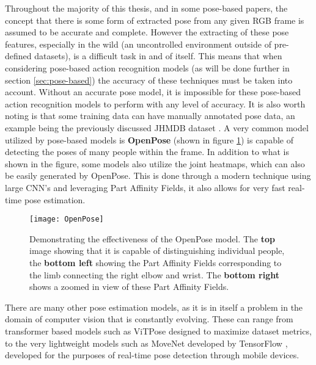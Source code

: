 Throughout the majority of this thesis, and in some pose-based papers, the concept that there is some form of extracted pose from any given RGB frame is assumed to be accurate and complete. However the extracting of these pose features, especially in the wild (an uncontrolled environment outside of pre-defined datasets), is a difficult task in and of itself. This means that when considering pose-based action recognition models (as will be done further in section \ref{sec:pose-based}) the accuracy of these techniques must be taken into account. Without an accurate pose model, it is impossible for these pose-based action recognition models to perform with any level of accuracy. It is also worth noting is that some training data can have manually annotated pose data, an example being the previously discussed JHMDB dataset \cite{JHMDB}. A very common model utilized by pose-based models is \textbf{OpenPose} \cite{openpose} (shown in figure \ref{fig:openpose}) is capable of detecting the poses of many people within the frame. In addition to what is shown in the figure, some models also utilize the joint heatmaps, which can also be easily generated by OpenPose. This is done through a modern technique using large CNN's and leveraging Part Affinity Fields, it also allows for very fast real-time pose estimation.

\begin{figure}[ht]
	\texttt{[image: OpenPose]}
	\centering
	\caption{Demonstrating the effectiveness of the OpenPose \cite{openpose} model. The \textbf{top} image showing that it is capable of distinguishing individual people, the \textbf{bottom left} showing the Part Affinity Fields corresponding to the limb connecting the right elbow and wrist. The \textbf{bottom right} shows a zoomed in view of these Part Affinity Fields.}
	\label{fig:openpose}
\end{figure}

There are many other pose estimation models, as it is in itself a problem in the domain of computer vision that is constantly evolving. These can range from transformer based models such as ViTPose \cite{vitpose} designed to maximize dataset metrics, to the very lightweight models such as MoveNet developed by TensorFlow \cite{tensorflow2015-whitepaper}, developed for the purposes of real-time pose detection through mobile devices.

